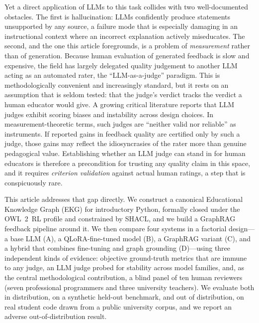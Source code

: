 \documentclass[sageh]{sagej}
\begin{document}
Yet a direct application of LLMs to this task collides with two well-documented obstacles. The first is hallucination: LLMs confidently produce statements unsupported by any source, a failure mode that is especially damaging in an instructional context where an incorrect explanation actively miseducates.\cite{ji2023hallucination,huang2023hallucination} The second, and the one this article foregrounds, is a problem of \emph{measurement} rather than of generation. Because human evaluation of generated feedback is slow and expensive, the field has largely delegated quality judgement to another LLM acting as an automated rater, the ``LLM-as-a-judge'' paradigm.\cite{zheng2023judging,li2024judges} This is methodologically convenient and increasingly standard, but it rests on an assumption that is seldom tested: that the judge's verdict tracks the verdict a human educator would give. A growing critical literature reports that LLM judges exhibit scoring biases and instability across design choices. In measurement-theoretic terms, such judges are ``neither valid nor reliable'' as instruments.\cite{hackl2023gpt4,yamauchi2025judge,li2025scoringbias,chehbouni2025neither} If reported gains in feedback quality are certified only by such a judge, those gains may reflect the idiosyncrasies of the rater more than genuine pedagogical value. Establishing whether an LLM judge can stand in for human educators is therefore a precondition for trusting any quality claim in this space, and it requires \emph{criterion validation} against actual human ratings, a step that is conspicuously rare.

This article addresses that gap directly. We construct a canonical Educational Knowledge Graph (EKG) for introductory Python, formally closed under the OWL~2~RL profile and constrained by SHACL, and we build a GraphRAG feedback pipeline around it. We then compare four systems in a factorial design---a base LLM (A), a QLoRA-fine-tuned model (B), a GraphRAG variant (C), and a hybrid that combines fine-tuning and graph grounding (D)---using three independent kinds of evidence: objective ground-truth metrics that are immune to any judge, an LLM judge probed for stability across model families, and, as the central methodological contribution, a blind panel of ten human reviewers (seven professional programmers and three university teachers). We evaluate both in distribution, on a synthetic held-out benchmark, and out of distribution, on real student code drawn from a public university corpus, and we report an adverse out-of-distribution result.
\end{document}
